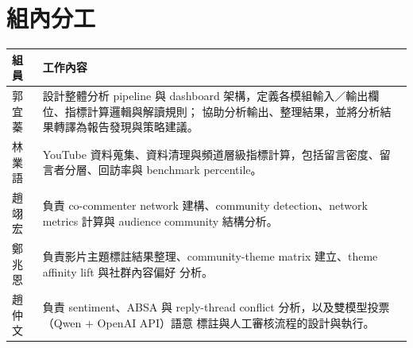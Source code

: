 \section*{組內分工}

\renewcommand{\arraystretch}{1.3}
\begin{table}[H]
\centering
\small
\begin{tabularx}{\linewidth}{l Y}
\toprule
\textbf{組員} & \textbf{工作內容}\\
\midrule
郭宜蓁 & 設計整體分析 pipeline 與 dashboard 架構，定義各模組輸入／輸出欄位、指標計算邏輯與解讀規則；
        協助分析輸出、整理結果，並將分析結果轉譯為報告發現與策略建議。\\
林業語 & YouTube 資料蒐集、資料清理與頻道層級指標計算，包括留言密度、留言者分層、回訪率與 benchmark
        percentile。\\
趙翊宏 & 負責 co-commenter network 建構、community detection、network metrics 計算與 audience
        community 結構分析。\\
鄭兆恩 & 負責影片主題標註結果整理、community-theme matrix 建立、theme affinity lift 與社群內容偏好
        分析。\\
趙仲文 & 負責 sentiment、ABSA 與 reply-thread conflict 分析，以及雙模型投票（Qwen $+$ OpenAI API）語意
        標註與人工審核流程的設計與執行。\\
\bottomrule
\end{tabularx}
\end{table}
